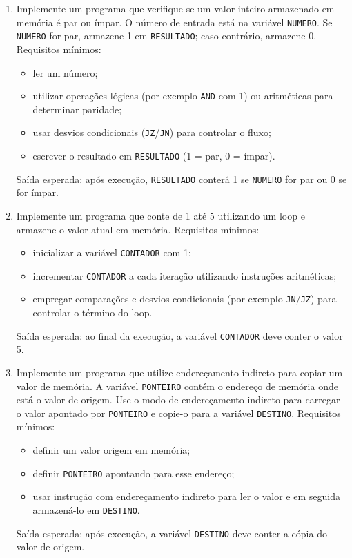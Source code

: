 \documentclass[12pt,a4paper]{article}
\begin{document}
\begin{enumerate}[left=0pt,label=\textbf{Exercício \arabic*:},itemsep=8pt]
\item Implemente um programa que verifique se um valor inteiro armazenado em memória é par ou ímpar.
O número de entrada está na variável \texttt{NUMERO}. Se \texttt{NUMERO} for par, armazene 1 em \texttt{RESULTADO}; caso contrário, armazene 0.
Requisitos mínimos:
\begin{itemize}
	\item ler um número;
	\item utilizar operações lógicas (por exemplo \texttt{AND} com 1) ou aritméticas para determinar paridade;
	\item usar desvios condicionais (\texttt{JZ}/\texttt{JN}) para controlar o fluxo;
	\item escrever o resultado em \texttt{RESULTADO} (1 = par, 0 = ímpar).
\end{itemize}
Saída esperada: após execução, \texttt{RESULTADO} conterá 1 se \texttt{NUMERO} for par ou 0 se for ímpar.

\item Implemente um programa que conte de 1 até 5 utilizando um loop e armazene o valor atual em memória.
Requisitos mínimos:
\begin{itemize}
	\item inicializar a variável \texttt{CONTADOR} com 1;
	\item incrementar \texttt{CONTADOR} a cada iteração utilizando instruções aritméticas;
	\item empregar comparações e desvios condicionais (por exemplo \texttt{JN}/\texttt{JZ}) para controlar o término do loop.
\end{itemize}
Saída esperada: ao final da execução, a variável \texttt{CONTADOR} deve conter o valor 5.

\item Implemente um programa que utilize endereçamento indireto para copiar um valor de memória.
A variável \texttt{PONTEIRO} contém o endereço de memória onde está o valor de origem. Use o modo de endereçamento indireto para carregar o valor apontado por \texttt{PONTEIRO} e copie-o para a variável \texttt{DESTINO}.
Requisitos mínimos:
\begin{itemize}
	\item definir um valor origem em memória;
	\item definir \texttt{PONTEIRO} apontando para esse endereço;
	\item usar instrução com endereçamento indireto para ler o valor e em seguida armazená-lo em \texttt{DESTINO}.
\end{itemize}
Saída esperada: após execução, a variável \texttt{DESTINO} deve conter a cópia do valor de origem.


\end{enumerate}
\end{document}
